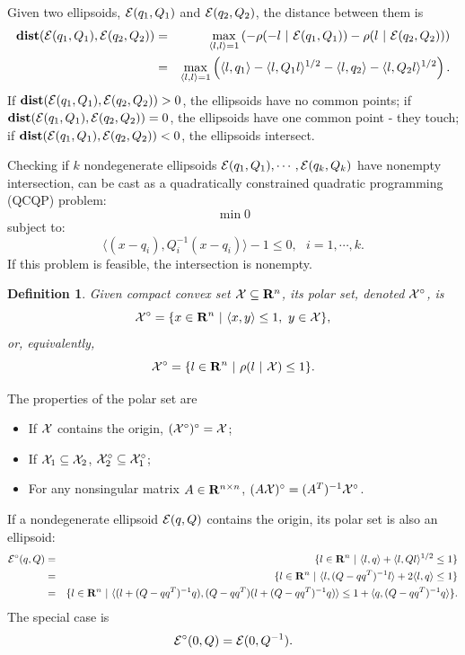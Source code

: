 \documentclass{report}
\newtheorem{df}{Definition}[section]
\newcommand{\bd}{\begin{df}}
\newcommand{\ed}{\end{df}}
\newcommand{\EE}{{\cal E}}
\newcommand{\XX}{{\cal X}}
\begin{document}
Given two ellipsoids, $\EE(q_1,Q_1)$ and $\EE(q_2,Q_2)$, the distance between
them is
\begin{eqnarray}
{\bf dist}(\EE(q_1,Q_1),\EE(q_2,Q_2)) & = & \max_{\langle l,l\rangle=1}
\left(-\rho(-l ~|~ \EE(q_1,Q_1)) - \rho(l ~|~ \EE(q_2,Q_2))\right) \\
& = & \max_{\langle l,l\rangle=1}\left(\langle l,q_1\rangle -
\langle l,Q_1l\rangle^{1/2} - \langle l,q_2\rangle -
\langle l,Q_2l\rangle^{1/2}\right). \label{dist_ell}
\end{eqnarray}
If ${\bf dist}(\EE(q_1,Q_1),\EE(q_2,Q_2)) > 0$,  the ellipsoids have no
common points;
if ${\bf dist}(\EE(q_1,Q_1),\EE(q_2,Q_2)) = 0$,  the ellipsoids have one
common point - they touch;
if ${\bf dist}(\EE(q_1,Q_1),\EE(q_2,Q_2)) < 0$,  the ellipsoids intersect.

Checking if $k$ nondegenerate ellipsoids $\EE(q_1,Q_1),\cdots,\EE(q_k,Q_k)$
have nonempty intersection, can be cast as a quadratically constrained
quadratic programming (QCQP) problem:
\[ \min 0 \]
subject to:
\[ \langle (x-q_i),Q_i^{-1}(x-q_i)\rangle - 1 \leq 0, ~~~ i=1,\cdots,k. \]
If this problem is feasible,  the intersection is nonempty.
\bd
Given compact convex set $\XX\subseteq{\bf R}^n$, its polar set, denoted
$\XX^\circ$, is
\[ \XX^\circ = \{x\in{\bf R}^n ~|~ \langle x,y\rangle\leq 1, ~ y\in\XX\}, \]
or, equivalently,
\[ \XX^\circ = \{l\in{\bf R}^n ~|~ \rho(l ~|~ \XX)\leq 1\}. \]
\ed
The properties of the polar set are
\begin{itemize}
\item If  $\XX$ contains the origin,  $(\XX^\circ)^\circ = \XX$;
\item If $\XX_1\subseteq\XX_2$,  $\XX_2^\circ\subseteq\XX_1^\circ$;
\item For any nonsingular matrix $A\in{\bf R}^{n\times n}$,
$(A\XX)^\circ = (A^T)^{-1}\XX^\circ$.
\end{itemize}
If a nondegenerate ellipsoid $\EE(q,Q)$ contains the origin,
 its polar set is also an ellipsoid:
\begin{eqnarray*}
\EE^\circ(q,Q) & = & \{l\in{\bf R}^n ~|~ \langle l,q\rangle +
\langle l,Ql\rangle^{1/2}\leq1 \}\\
& = & \{l\in{\bf R}^n ~|~ \langle l,(Q-qq^T)^{-1}l\rangle +
2\langle l,q\rangle\leq1 \}\\ 
& = & \{l\in{\bf R}^n ~|~ \langle(l+(Q-qq^T)^{-1}q),
(Q-qq^T)(l+(Q-qq^T)^{-1}q)\rangle\leq1+\langle q,(Q-qq^T)^{-1}q\rangle \}.
\end{eqnarray*}
The special case is
\[ \EE^\circ(0,Q) = \EE(0,Q^{-1}). \]
\end{document}
